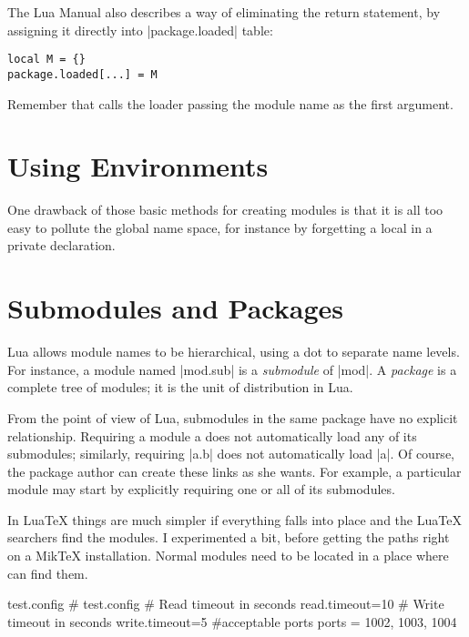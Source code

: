 The Lua Manual also describes a way of eliminating the return statement, by assigning it directly into |package.loaded| table:

\begin{verbatim}
local M = {}
package.loaded[...] = M
\end{verbatim}

Remember that  calls the loader passing the module name as the first argument.

\section{Using Environments}

One drawback of those basic methods for creating modules is that it is all too easy to pollute the global name space, for instance by forgetting a local in a private declaration.

\section{Submodules and Packages}

Lua allows module names to be hierarchical, using a dot to separate name levels. For instance, a module named |mod.sub| is a \textit{submodule} of |mod|. A \textit{package} is a complete tree of modules; it is the unit of distribution in Lua. 

From the point of view of Lua, submodules in the same package have no explicit relationship. Requiring a module a does not automatically load any of its submodules; similarly, requiring |a.b| does not automatically load |a|. Of course, the package author can create these links as she wants. For example, a particular module may start by explicitly requiring one or all of its submodules.

In LuaTeX things are much simpler if everything falls into place and the LuaTeX searchers find the modules. I experimented a bit, before getting the paths right on a MikTeX installation. Normal modules need to be located in a place where \tex can find them.

\begin{filecontents*}{test.config}
    # test.config
    # Read timeout in seconds
    read.timeout=10
    # Write timeout in seconds
    write.timeout=5
   #acceptable ports
   ports = 1002, 1003, 1004
\end{filecontents*}

